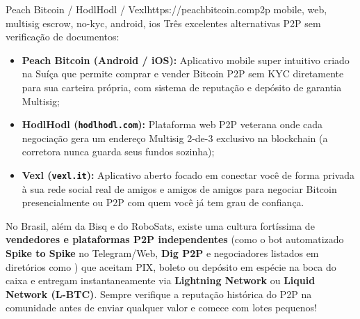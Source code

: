 \documentclass{pousadaguide}
\begin{document}
\begin{ferramenta}[recomendado,logo=peach]{Peach Bitcoin / HodlHodl / Vexl}{https://peachbitcoin.com}{p2p mobile, web, multisig escrow, no-kyc, android, ios}
Três excelentes alternativas P2P sem verificação de documentos:
\begin{itemize}
  \item \textbf{Peach Bitcoin (Android / iOS):} Aplicativo mobile super intuitivo criado na Suíça que permite comprar e vender Bitcoin P2P sem KYC diretamente para sua carteira própria, com sistema de reputação e depósito de garantia Multisig;
  \item \textbf{HodlHodl (\texttt{hodlhodl.com}):} Plataforma web P2P veterana onde cada negociação gera um endereço Multisig 2-de-3 exclusivo na blockchain (a corretora nunca guarda seus fundos sozinha);
  \item \textbf{Vexl (\texttt{vexl.it}):} Aplicativo aberto focado em conectar você de forma privada à sua rede social real de amigos e amigos de amigos para negociar Bitcoin presencialmente ou P2P com quem você já tem grau de confiança.
\end{itemize}
\end{ferramenta}

\begin{dica}
No Brasil, além da Bisq e do RoboSats, existe uma cultura fortíssima de \textbf{vendedores e plataformas P2P independentes} (como o bot automatizado \textbf{Spike to Spike} no Telegram/Web, \textbf{Dig P2P} e negociadores listados em diretórios como ) que aceitam PIX, boleto ou depósito em espécie na boca do caixa e entregam instantaneamente via \textbf{Lightning Network} ou \textbf{Liquid Network (L-BTC)}. Sempre verifique a reputação histórica do P2P na comunidade antes de enviar qualquer valor e comece com lotes pequenos!
\end{dica}
\end{document}
